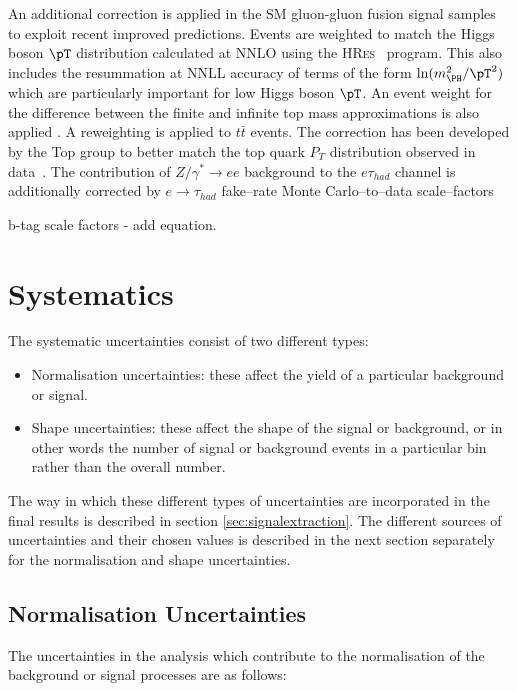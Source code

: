 An additional correction is applied in the \ac{SM} gluon-gluon fusion signal
samples to exploit recent improved predictions. Events are weighted to match the
Higgs boson $\pT$ distribution calculated at \ac{NNLO} using the
\textsc{HRes}~\cite{deFlorian:2012mx} program. This also includes the
resummation at \ac{NNLL} accuracy of terms of the form
$\ln(m_{\PH}^{2}/\pT^{2})$ which are particularly important for low Higgs boson
$\pT$. An event weight for the difference between the finite and infinite top
mass approximations is also applied \cite{Grazzini:2013mca}.
A reweighting is applied to $t \bar{t}$ events. The correction has been developed by the Top
group to better match the top quark $P_{T}$ distribution observed in data~\cite{TopPtReweighting}. 
The contribution of $Z/\gamma^{*} \to ee$ background to the $e\tau_{had}$ channel
is additionally corrected by $e \to \tau_{had}$ fake--rate Monte Carlo--to--data
scale--factors

b-tag scale factors - add equation.

\section{Systematics}
\label{sec:systematics}

The systematic uncertainties consist of two different types:

\begin{itemize} 
\item Normalisation uncertainties: these affect the yield of a particular background or
signal.
\item Shape uncertainties: these affect the shape of the signal or background, or in
other words the number of signal or background events in a particular bin rather
than the overall number.
\end{itemize}

The way in which these different types of uncertainties are incorporated in the
final results is described in section \ref{sec:signalextraction}. The different
sources of uncertainties and their chosen values is described in the next
section separately for the normalisation and shape uncertainties.

\subsection{Normalisation Uncertainties}
\label{sec:systematicUncertainties_yield}

The uncertainties in the analysis which contribute to the normalisation of the
background or signal processes are as follows:

